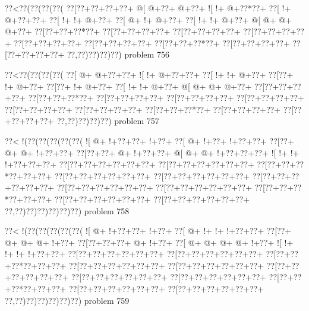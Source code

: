\vbox{\vbox{\goo
\0??<\0??(\0??(\0??(\0??(
\0??[\0??+\0??+\0??+\0??+
\- @[\- @+\0??+\- @+\0??+
\- ![\- !+\- @+\0??*\0??+
\0??[\- !+\- @+\0??+\0??+
\0??[\- !+\- !+\- @+\0??+
\0??[\- @+\- !+\- @+\0??+
\0??[\- !+\- !+\- @+\0??+
\- @[\- @+\- @+\- @+\0??+
\0??[\0??+\0??+\0??*\0??+
\0??[\0??+\0??+\0??+\0??+
\0??[\0??+\0??+\0??+\0??+
\0??[\0??+\0??+\0??+\0??+
\0??[\0??+\0??+\0??+\0??+
\0??[\0??+\0??+\0??+\0??+
\0??[\0??+\0??+\0??*\0??+
\0??[\0??+\0??+\0??+\0??+
\0??[\0??+\0??+\0??+\0??+
\0??,\0??)\0??)\0??)\0??)
}
\hfil problem 756\hfil\break
}

\vbox{\vbox{\goo
\0??<\0??(\0??(\0??(\0??(
\0??[\- @+\- @+\0??+\0??+
\- ![\- !+\- @+\0??+\0??+
\0??[\- !+\- !+\- @+\0??+
\0??[\0??+\- !+\- @+\0??+
\0??[\0??+\- !+\- @+\0??+
\0??[\- !+\- !+\- @+\0??+
\- @[\- @+\- @+\- @+\0??+
\0??[\0??+\0??+\0??+\0??+
\0??[\0??+\0??+\0??*\0??+
\0??[\0??+\0??+\0??+\0??+
\0??[\0??+\0??+\0??+\0??+
\0??[\0??+\0??+\0??+\0??+
\0??[\0??+\0??+\0??+\0??+
\0??[\0??+\0??+\0??+\0??+
\0??[\0??+\0??+\0??*\0??+
\0??[\0??+\0??+\0??+\0??+
\0??[\0??+\0??+\0??+\0??+
\0??,\0??)\0??)\0??)\0??)
}
\hfil problem 757\hfil\break
}

\vbox{\vbox{\goo
\0??<\- !(\0??(\0??(\0??(\0??(\0??(
\- ![\- @+\- !+\0??+\0??+\- !+\0??+
\0??[\- @+\- !+\0??+\- !+\0??+\0??+
\0??[\0??+\- @+\- @+\- !+\0??+\0??+
\0??[\0??+\0??+\- @+\- !+\0??+\0??+
\- @[\- @+\- @+\- !+\0??+\0??+\0??+
\- ![\- !+\- !+\- !+\0??+\0??+\0??+
\0??[\0??+\0??+\0??+\0??+\0??+\0??+
\0??[\0??+\0??+\0??+\0??+\0??+\0??+
\0??[\0??+\0??+\0??*\0??+\0??+\0??+
\0??[\0??+\0??+\0??+\0??+\0??+\0??+
\0??[\0??+\0??+\0??+\0??+\0??+\0??+
\0??[\0??+\0??+\0??+\0??+\0??+\0??+
\0??[\0??+\0??+\0??+\0??+\0??+\0??+
\0??[\0??+\0??+\0??+\0??+\0??+\0??+
\0??[\0??+\0??+\0??*\0??+\0??+\0??+
\0??[\0??+\0??+\0??+\0??+\0??+\0??+
\0??[\0??+\0??+\0??+\0??+\0??+\0??+
\0??,\0??)\0??)\0??)\0??)\0??)\0??)
}
\hfil problem 758\hfil\break
}

\vbox{\vbox{\goo
\0??<\- !(\0??(\0??(\0??(\0??(\0??(
\- ![\- @+\- !+\0??+\0??+\- !+\0??+
\0??[\- @+\- !+\- !+\- !+\0??+\0??+
\0??[\0??+\- @+\- @+\- @+\- !+\0??+
\0??[\0??+\0??+\0??+\- @+\- !+\0??+
\0??[\- @+\- @+\- @+\- @+\- !+\0??+
\- ![\- !+\- !+\- !+\- !+\0??+\0??+
\0??[\0??+\0??+\0??+\0??+\0??+\0??+
\0??[\0??+\0??+\0??+\0??+\0??+\0??+
\0??[\0??+\0??+\0??*\0??+\0??+\0??+
\0??[\0??+\0??+\0??+\0??+\0??+\0??+
\0??[\0??+\0??+\0??+\0??+\0??+\0??+
\0??[\0??+\0??+\0??+\0??+\0??+\0??+
\0??[\0??+\0??+\0??+\0??+\0??+\0??+
\0??[\0??+\0??+\0??+\0??+\0??+\0??+
\0??[\0??+\0??+\0??*\0??+\0??+\0??+
\0??[\0??+\0??+\0??+\0??+\0??+\0??+
\0??[\0??+\0??+\0??+\0??+\0??+\0??+
\0??,\0??)\0??)\0??)\0??)\0??)\0??)
}
\hfil problem 759\hfil\break
}

